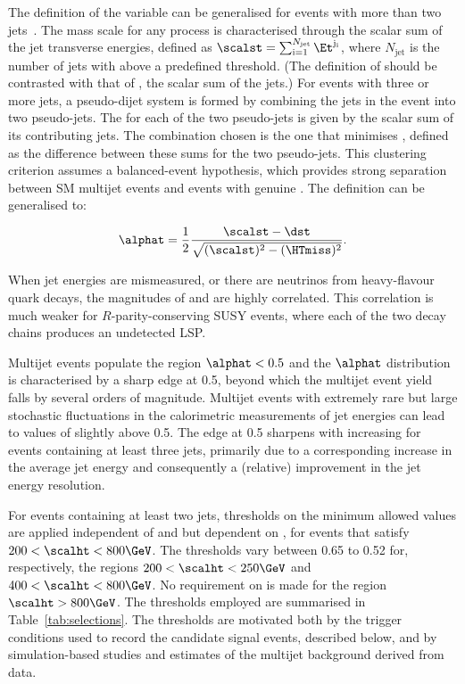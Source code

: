 The definition of the \alphat variable can be generalised for events
with more than two jets~\cite{RA1Paper}. The mass scale for any
process is characterised through the scalar sum of the jet transverse
energies, defined as $\scalst = \sum_{\textrm{i}=1}^{N_\text{jet}}
\Et^{\mathrm{j_i}}$, where $N_\text{jet}$ is the number of jets with
\Et above a predefined threshold. (The definition of \scalst should be
contrasted with that of \scalht, the scalar \Pt sum of the jets.)
For events with three or more jets, a pseudo-dijet system is formed by
combining the jets in the event into two pseudo-jets. The \scalst for
each of the two pseudo-jets is given by the scalar \Et sum of its
contributing jets. The combination chosen is the one that minimises
\dst, defined as the difference between these sums for the two
pseudo-jets.  This clustering criterion assumes a balanced-event
hypothesis, which provides strong separation between SM multijet
events and events with genuine \ptvecmiss. The \alphat definition can
be generalised to:

\begin{equation}
  \label{eq:alphat}
  \alphat = \frac{1}{2} \frac{\scalst -
    \dst}{\sqrt{(\scalst)^2 - (\HTmiss)^2}}.
\end{equation}

When jet energies are mismeasured, or there are neutrinos from
heavy-flavour quark decays, the magnitudes of \HTmiss and \dst are
highly correlated. This correlation is much weaker for
$R$-parity-conserving SUSY events, where each of the two decay chains
produces an undetected LSP.

Multijet events populate the region $\alphat< 0.5$ and the $\alphat$
distribution is characterised by a sharp edge at 0.5, beyond which the
multijet event yield falls by several orders of magnitude. Multijet
events with extremely rare but large stochastic fluctuations in the
calorimetric measurements of jet energies can lead to values of
\alphat slightly above 0.5. The edge at 0.5 sharpens with increasing
\scalht for events containing at least three jets, primarily due to a
corresponding increase in the average jet energy and consequently a
(relative) improvement in the jet energy resolution.

For events containing at least two jets, thresholds on the minimum
allowed \alphat values are applied independent of \njet and \nb but
dependent on \scalht, for events that satisfy $200 < \scalht <
800\GeV$. The \alphat thresholds vary between 0.65 to 0.52 for,
respectively, the regions $200 < \scalht < 250\GeV$ and $400 < \scalht
< 800\GeV$. No requirement on \alphat is made for the region $\scalht
> 800\GeV$. The thresholds employed are summarised in
Table~\ref{tab:selections}. The \alphat thresholds are motivated both
by the trigger conditions used to record the candidate signal events,
described below, and by simulation-based studies and estimates of the
multijet background derived from data. 

